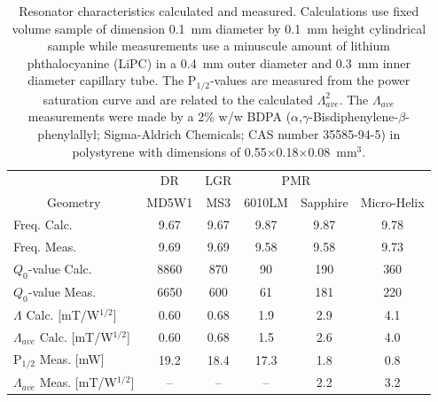 \begin{table}[htbp]
\centering
\caption[Resonator characteristics calculated and measured.]{Resonator characteristics calculated and measured. Calculations use fixed volume sample of dimension  0.1~mm diameter by 0.1~mm height cylindrical sample while measurements use a minuscule amount of lithium phthalocyanine (LiPC) in a 0.4~mm outer diameter and 0.3~mm inner diameter capillary tube. The P$_{1/2}$-values are measured from the power saturation curve and are related to the calculated $\Lambda_{ave}^2$. The $\Lambda_{ave}$ measurements were made by a 2\% w/w BDPA ($\alpha$,$\gamma$-Bisdiphenylene-$\beta$-phenylallyl; Sigma-Aldrich Chemicals; CAS number 35585-94-5) in polystyrene with dimensions of 0.55$\times$0.18$\times$0.08~mm$^3$.}
\label{table:chars}
\begin{tabular}{l|c|c|c|c|c}
\multicolumn{1}{l}{} & DR & LGR & \multicolumn{2}{c|}{PMR} &  \\
\multicolumn{1}{c||}{Geometry} & MD5W1 & MS3 & 6010LM & Sapphire & Micro-Helix \\ \hline \hline
\multicolumn{1}{l||}{Freq. Calc.} & \multicolumn{1}{c|}{9.67} & \multicolumn{1}{c|}{9.67} & \multicolumn{1}{c|}{9.87} & \multicolumn{1}{c|}{9.87} & 9.78 \\ \hline 
\multicolumn{1}{l||}{Freq. Meas.} & \multicolumn{1}{c|}{9.69} & \multicolumn{1}{c|}{9.69} & \multicolumn{1}{c|}{9.58} & \multicolumn{1}{c|}{9.58} & 9.73 \\ \hline 
\multicolumn{1}{l||}{$Q_0$-value Calc.} & \multicolumn{1}{c|}{8860} & \multicolumn{1}{c|}{870} & \multicolumn{1}{c|}{90} & \multicolumn{1}{c|}{190} & 360 \\ \hline 
\multicolumn{1}{l||}{$Q_0$-value Meas.} & \multicolumn{1}{c|}{6650} & \multicolumn{1}{c|}{600} & \multicolumn{1}{c|}{61} & \multicolumn{1}{c|}{181} & 220 \\ \hline
\multicolumn{1}{l||}{$\Lambda$ Calc. {[}mT/W$^{1/2}${]}} & \multicolumn{1}{c|}{0.60} & \multicolumn{1}{c|}{0.68} & \multicolumn{1}{c|}{1.9} & \multicolumn{1}{c|}{2.9} & 4.1 \\ \hline 
\multicolumn{1}{l||}{$\Lambda_{ave}$ Calc. {[}mT/W$^{1/2}${]}} & \multicolumn{1}{c|}{0.60} & \multicolumn{1}{c|}{0.68} & \multicolumn{1}{c|}{1.5} & \multicolumn{1}{c|}{2.6} & 4.0 \\ \hline 
\multicolumn{1}{l||}{P$_{1/2}$ Meas. {[}mW{]}} & \multicolumn{1}{c|}{19.2} & \multicolumn{1}{c|}{18.4} & \multicolumn{1}{c|}{17.3} & \multicolumn{1}{c|}{1.8} & 0.8 \\ \hline 
\multicolumn{1}{l||}{$\Lambda_{ave}$ Meas. {[}mT/W$^{1/2}${]}} & \multicolumn{1}{c|}{–} & \multicolumn{1}{c|}{–} & \multicolumn{1}{c|}{–} & \multicolumn{1}{c|}{2.2} & 3.2
\end{tabular}
\end{table}


